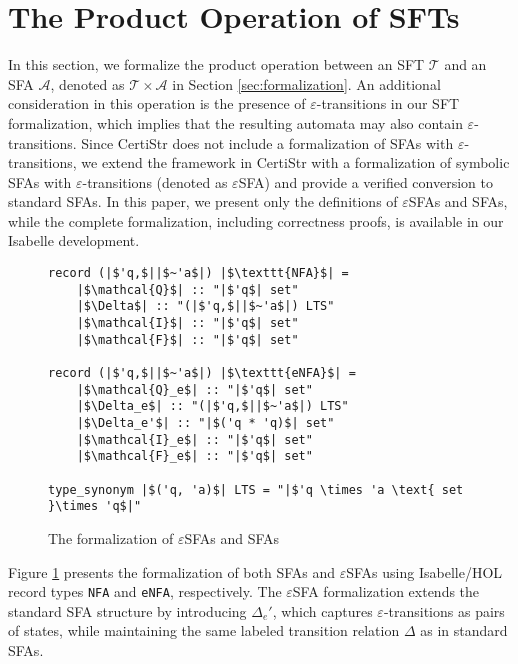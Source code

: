 \documentclass[a4paper,UKenglish,cleveref, autoref, thm-restate]{lipics-v2021}
\begin{document}

\section{The Product Operation of SFTs}
\label{sec:product-operation}

In this section, we formalize the product operation between an SFT $\mathcal{T}$ and an SFA $\mathcal{A}$, denoted as $\mathcal{T} \times \mathcal{A}$ in Section \ref{sec:formalization}. An additional consideration in this operation is the presence of $\varepsilon$-transitions in our SFT formalization, which implies that the resulting automata may also contain $\varepsilon$-transitions. Since CertiStr \cite{cpp/KanLRS22} does not include a formalization of SFAs with $\varepsilon$-transitions, we extend the framework in CertiStr with a formalization of symbolic SFAs with $\varepsilon$-transitions (denoted as $\varepsilon$SFA) and provide a verified conversion to standard SFAs. In this paper, we present only the definitions of  $\varepsilon$SFAs and SFAs, while the complete formalization, including correctness proofs, is available in our Isabelle development.

\begin{figure}[hbt!]
	\begin{lstlisting}
record (|$'q,$||$~'a$|) |$\texttt{NFA}$| =
	|$\mathcal{Q}$| :: "|$'q$| set"
	|$\Delta$| :: "(|$'q,$||$~'a$|) LTS"
	|$\mathcal{I}$| :: "|$'q$| set"
	|$\mathcal{F}$| :: "|$'q$| set"

record (|$'q,$||$~'a$|) |$\texttt{eNFA}$| =
	|$\mathcal{Q}_e$| :: "|$'q$| set"
	|$\Delta_e$| :: "(|$'q,$||$~'a$|) LTS"
	|$\Delta_e'$| :: "|$('q * 'q)$| set"
	|$\mathcal{I}_e$| :: "|$'q$| set"
	|$\mathcal{F}_e$| :: "|$'q$| set"

type_synonym |$('q, 'a)$| LTS = "|$'q \times 'a \text{ set }\times 'q$|"    
	\end{lstlisting}
\caption{The formalization of $\varepsilon$SFAs and SFAs}
\label{fig-def-FAs}
\end{figure}

Figure \ref{fig-def-FAs} presents the formalization of both SFAs and $\varepsilon$SFAs using Isabelle/HOL record types \texttt{NFA} and \texttt{eNFA}, respectively. The $\varepsilon$SFA formalization extends the standard SFA structure by introducing $\Delta_e'$, which captures $\varepsilon$-transitions as pairs of states, while maintaining the same labeled transition relation $\Delta$ as in standard SFAs.
\end{document}
